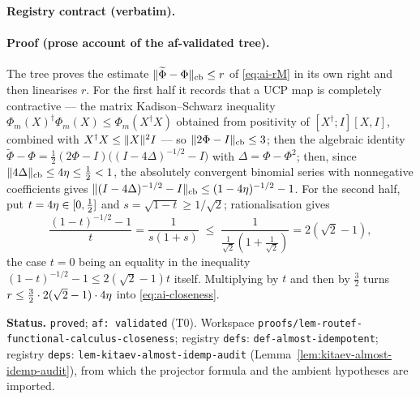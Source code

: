 \noindent\textbf{Registry contract (verbatim).}

\paragraph{Proof (prose account of the af-validated tree).}
The tree proves the estimate $\lVert \widetilde\Phi-\Phi\rVert_{\mathrm{cb}}\le r$ of
\eqref{eq:ai-rM} in its own right and then linearises $r$. For the first half it records
that a UCP map is completely contractive --- the matrix Kadison--Schwarz inequality
$\Phi_{m}(X)^{\dagger}\Phi_{m}(X)\le\Phi_{m}(X^{\dagger}X)$ obtained from positivity of
$[X^{\dagger};I][X,I]$, combined with $X^{\dagger}X\le\lVert X\rVert^{2}I$ --- so
$\lVert 2\Phi-I\rVert_{\mathrm{cb}}\le3$; then the algebraic identity
$\widetilde\Phi-\Phi=\tfrac12(2\Phi-I)\bigl((I-4\Delta)^{-1/2}-I\bigr)$ with
$\Delta=\Phi-\Phi^{2}$; then, since $\lVert 4\Delta\rVert_{\mathrm{cb}}\le4\eta\le\tfrac12<1$,
the absolutely convergent binomial series with nonnegative coefficients gives
$\lVert (I-4\Delta)^{-1/2}-I\rVert_{\mathrm{cb}}\le(1-4\eta)^{-1/2}-1$. For the second half,
put $t=4\eta\in[0,\tfrac12]$ and $s=\sqrt{1-t}\ge1/\sqrt2$; rationalisation gives
\[
  \frac{(1-t)^{-1/2}-1}{t}=\frac1{s(1+s)}\;\le\;\frac{1}{\tfrac1{\sqrt2}(1+\tfrac1{\sqrt2})}
  =2(\sqrt2-1),
\]
the case $t=0$ being an equality in the inequality $(1-t)^{-1/2}-1\le2(\sqrt2-1)t$ itself.
Multiplying by $t$ and then by $\tfrac32$ turns
$r\le\tfrac32\cdot2(\sqrt2-1)\cdot4\eta$ into \eqref{eq:ai-closeness}.

\medskip
\noindent\textbf{Status.} \texttt{proved}; \texttt{af: validated} (T0). Workspace
\texttt{proofs/lem-routef-functional-calculus-closeness}; registry \texttt{defs}:
\texttt{def-almost-idempotent}; registry \texttt{deps}:
\texttt{lem-kitaev-almost-idemp-audit} (Lemma~\ref{lem:kitaev-almost-idemp-audit}), from
which the projector formula and the ambient hypotheses are imported.

